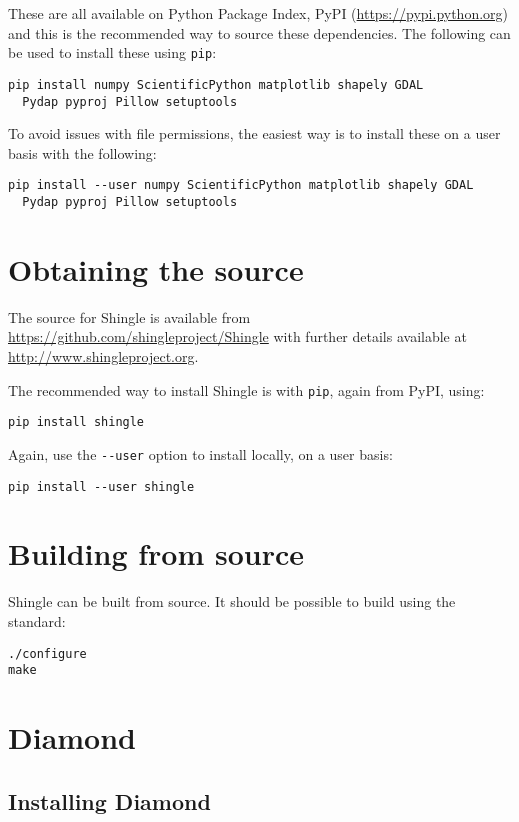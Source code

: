 \documentclass[a4paper, 10pt]{book}
\providecommand{\shingle}{Shingle\xspace}
\begin{document}
\noindent
These are all available on Python Package Index, PyPI
(\url{https://pypi.python.org})
and this is the recommended way to source these dependencies.
The following can be used to install these using \verb+pip+:
\begin{verbatim}
pip install numpy ScientificPython matplotlib shapely GDAL
  Pydap pyproj Pillow setuptools
\end{verbatim}

\noindent
To avoid issues with file permissions, the easiest way is to install these on a user basis with the following:
\begin{verbatim}
pip install --user numpy ScientificPython matplotlib shapely GDAL
  Pydap pyproj Pillow setuptools
\end{verbatim}

\section{Obtaining the source}

\noindent
The source for \shingle is available from
\url{https://github.com/shingleproject/Shingle}
with further details available at
\url{http://www.shingleproject.org}.

\noindent
The recommended way to install \shingle is with \verb+pip+, again from PyPI, using:
\begin{verbatim}
pip install shingle 
\end{verbatim}

\noindent
Again, use the \verb+--user+ option to install locally, on a user basis:
\begin{verbatim}
pip install --user shingle 
\end{verbatim}

\section{Building from source}

\shingle can be built from source.  It should be possible to build using the standard:
\begin{verbatim}
./configure
make
\end{verbatim}

\section{Diamond}

\subsection{Installing Diamond}
\end{document}
